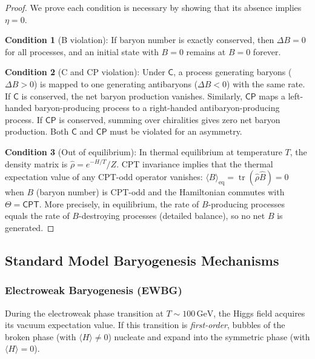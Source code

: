 \documentclass[12pt]{article}
\theoremstyle{definition}
\theoremstyle{remark}
\newcommand{\CPT}{\mathsf{CPT}}
\newcommand{\C}{\mathsf{C}}
\newcommand{\CP}{\mathsf{CP}}
\newcommand{\tr}{\operatorname{tr}}
\newcommand{\GeV}{\,\text{GeV}}
\begin{document}
\begin{proof}
We prove each condition is necessary by showing that its absence implies $\eta = 0$.

\textbf{Condition 1} (B violation): If baryon number is exactly conserved, then
$\Delta B = 0$ for all processes, and an initial state with $B = 0$ remains at $B = 0$
forever.

\textbf{Condition 2} (C and CP violation): Under $\C$, a process generating baryons
($\Delta B > 0$) is mapped to one generating antibaryons ($\Delta B < 0$) with the same
rate. If $\C$ is conserved, the net baryon production vanishes. Similarly, $\CP$
maps a left-handed baryon-producing process to a right-handed antibaryon-producing
process. If $\CP$ is conserved, summing over chiralities gives zero net baryon production.
Both $\C$ and $\CP$ must be violated for an asymmetry.

\textbf{Condition 3} (Out of equilibrium): In thermal equilibrium at temperature $T$,
the density matrix is $\hat{\rho} = e^{-H/T}/Z$. CPT invariance implies that the
thermal expectation value of any CPT-odd operator vanishes:
$\langle B \rangle_{\text{eq}} = \tr(\hat{\rho} \hat{B}) = 0$ when $B$ (baryon number)
is CPT-odd and the Hamiltonian commutes with $\Theta = \CPT$. More precisely, in
equilibrium, the rate of $B$-producing processes equals the rate of $B$-destroying
processes (detailed balance), so no net $B$ is generated.
\end{proof}

\subsection{Standard Model Baryogenesis Mechanisms}

\subsubsection{Electroweak Baryogenesis (EWBG)}

During the electroweak phase transition at $T \sim 100\GeV$, the Higgs field acquires
its vacuum expectation value. If this transition is \emph{first-order}, bubbles of
the broken phase (with $\langle H \rangle \neq 0$) nucleate and expand into the
symmetric phase (with $\langle H \rangle = 0$).
\end{document}
